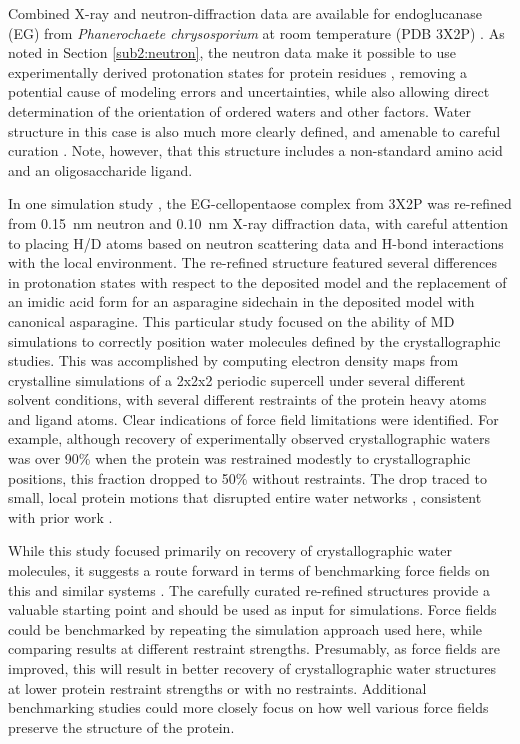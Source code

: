 \documentclass[9pt,review]{livecoms}
\begin{document}
Combined X-ray and neutron-diffraction data are available for endoglucanase (EG) from \textit{Phanerochaete chrysosporium} at room temperature (PDB 3X2P) \cite{nakamura_newtons_2015}.
As noted in Section \ref{sub2:neutron}, the neutron data make it possible to use experimentally derived protonation states for protein residues \cite{blakeley_neutron_2009,chen_direct_2012,ashkar_neutron_2018}, removing a potential cause of modeling errors and uncertainties, while also allowing direct determination of the orientation of ordered waters and other factors.
Water structure in this case is also much more clearly defined, and amenable to careful curation \cite{blakeley_15-k_2004,wall_biomolecular_2019}.
Note, however, that this structure includes a non-standard amino acid and an oligosaccharide ligand.

In one simulation study \cite{wall_biomolecular_2019}, the EG-cellopentaose complex from 3X2P was re-refined from \qty{0.15}{\nano\meter} neutron and \qty{0.10}{\nano\meter} X-ray diffraction data, with careful attention to placing H/D atoms based on neutron scattering data and H-bond interactions with the local environment.
The re-refined structure featured several differences in protonation states with respect to the deposited model and the replacement of an imidic acid form for an asparagine sidechain in the deposited model with canonical asparagine.
This particular study focused on the ability of MD simulations to correctly position water molecules defined by the crystallographic studies.
This was accomplished by computing electron density maps from crystalline simulations of a 2x2x2 periodic supercell under several different solvent conditions, with several different restraints of the protein heavy atoms and ligand atoms.
Clear indications of force field limitations were identified.
For example, although recovery of experimentally observed crystallographic waters was over 90\% when the protein was restrained modestly to crystallographic positions, this fraction dropped to 50\% without restraints.
The drop traced to small, local protein motions that disrupted entire water networks \cite{wall_biomolecular_2019}, consistent with prior work \cite{lexa_full_2011}.

While this study focused primarily on recovery of crystallographic water molecules, it suggests a route forward in terms of benchmarking force fields on this and similar systems \cite{wall_biomolecular_2019}.
The carefully curated re-refined structures provide a valuable starting point and should be used as input for simulations.
Force fields could be benchmarked by repeating the simulation approach used here, while comparing results at different restraint strengths.
Presumably, as force fields are improved, this will result in better recovery of crystallographic water structures at lower protein restraint strengths or with no restraints.
Additional benchmarking studies could more closely focus on how well various force fields preserve the structure of the protein.
\end{document}
